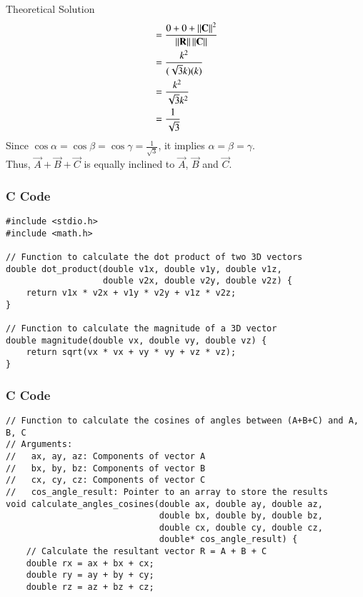 \documentclass{beamer}
\begin{document}
\begin{frame}{Theoretical Solution}
\begin{align}
&= \frac{0 + 0 + \left\lVert\mathbf{C}\right\rVert^2}{\left\lVert\mathbf{R}\right\rVert \left\lVert\mathbf{C}\right\rVert}   \\
&= \frac{k^2}{(\sqrt{3}k)(k)}   \\
&= \frac{k^2}{\sqrt{3}k^2}   \\
&= \frac{1}{\sqrt{3}}
\end{align}
Since $\cos \alpha = \cos \beta = \cos \gamma = \frac{1}{\sqrt{3}}$, it implies $\alpha = \beta = \gamma$.\\
Thus, $\vec{A}+\vec{B}+\vec{C}$ is equally inclined to $\vec{A}$, $\vec{B}$ and $\vec{C}$.
\end{frame}

\begin{frame}[fragile]
\frametitle{C Code}
\begin{lstlisting}
#include <stdio.h>
#include <math.h>

// Function to calculate the dot product of two 3D vectors
double dot_product(double v1x, double v1y, double v1z,
                   double v2x, double v2y, double v2z) {
    return v1x * v2x + v1y * v2y + v1z * v2z;
}

// Function to calculate the magnitude of a 3D vector
double magnitude(double vx, double vy, double vz) {
    return sqrt(vx * vx + vy * vy + vz * vz);
}
\end{lstlisting}
\end{frame}

\begin{frame}[fragile]
\frametitle{C Code}
\begin{lstlisting}
// Function to calculate the cosines of angles between (A+B+C) and A, B, C
// Arguments:
//   ax, ay, az: Components of vector A
//   bx, by, bz: Components of vector B
//   cx, cy, cz: Components of vector C
//   cos_angle_result: Pointer to an array to store the results
void calculate_angles_cosines(double ax, double ay, double az,
                              double bx, double by, double bz,
                              double cx, double cy, double cz,
                              double* cos_angle_result) {
    // Calculate the resultant vector R = A + B + C
    double rx = ax + bx + cx;
    double ry = ay + by + cy;
    double rz = az + bz + cz;
\end{lstlisting}
\end{frame}
\end{document}

